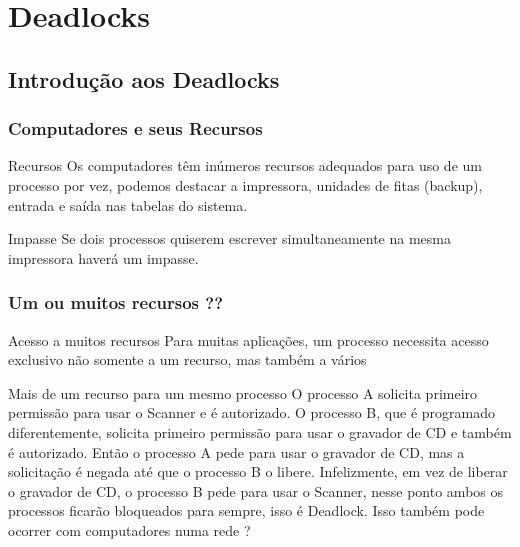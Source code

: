\documentclass[11pt]{beamer}
\begin{document}
\section{ Deadlocks}
\subsection*{ Introdução aos Deadlocks}

\begin{frame}\frametitle{ Computadores e seus Recursos}
  
\pause
\begin{block}{ Recursos}
  Os computadores têm inúmeros recursos adequados para uso de um processo por vez, 
  podemos destacar a impressora, unidades de fitas (backup), entrada e saída nas tabelas do sistema.
\end{block}
 
 \pause
\begin{alertblock}{ Impasse}
 Se dois processos quiserem escrever simultaneamente na mesma impressora haverá um impasse. 
\end{alertblock}
 
\end{frame}


\begin{frame}\frametitle{ Um ou muitos recursos ??}

\begin{block}{ Acesso a muitos recursos}
  Para muitas aplicações, um processo necessita acesso exclusivo não somente a um recurso, mas também a vários
\end{block}

\pause
\begin{exampleblock}{ Mais de um recurso para um mesmo processo}
  O processo A solicita primeiro permissão para usar o Scanner e é autorizado.
  O processo B, que é programado diferentemente, solicita primeiro permissão para usar o gravador de CD e também é autorizado.
  Então o processo A pede para usar o gravador de CD, mas a solicitação é negada até que o processo B o libere. 
  Infelizmente, em vez de liberar o gravador de CD, o processo B pede para usar o Scanner, nesse ponto ambos os processos ficarão bloqueados 
  para sempre, isso é Deadlock. Isso também pode ocorrer com computadores numa rede ?
\end{exampleblock}

\end{frame}
\end{document}
